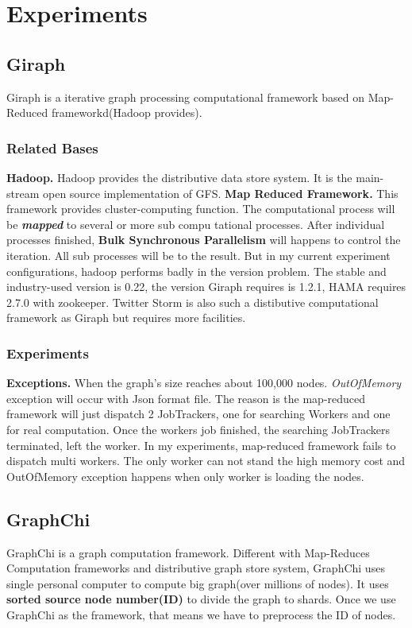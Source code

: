 \documentclass{article}
\begin{document}
	\newpage
	\section{Experiments}
	\subsection{Giraph}
	Giraph is a iterative graph processing computational framework based on Map-Reduced frameworkd(Hadoop provides).
	\subsubsection{Related Bases}
	\textbf{Hadoop.} Hadoop provides the distributive data store system. It is the main-stream open source implementation of GFS\cite{ghemawat2003the}.\newline
	\textbf{Map Reduced Framework\cite{lammel2008google's}.} This framework provides cluster-computing function. The computational process will be \textbf{\emph{mapped}} to several or more sub compu tational processes. After individual processes finished, \textbf{Bulk Synchronous Parallelism\cite{gerbessiotis1994direct}} will happens to control the iteration. All sub processes will be  to the result.\newline
	But in my current experiment configurations, hadoop performs badly in the version problem. The stable and industry-used version is 0.22, the version Giraph requires is 1.2.1, HAMA\cite{seo2010hama:} requires 2.7.0 with zookeeper. Twitter Storm\cite{storm} is also such a distibutive computational framework as Giraph but requires more facilities.
	\subsubsection{Experiments}
	\textbf{Exceptions.} When the graph's size reaches about 100,000 nodes. \emph{OutOfMemory} exception will occur with Json format file. The reason is the map-reduced framework will just dispatch 2 JobTrackers, one for searching Workers and one for real computation. Once the workers job finished, the searching JobTrackers terminated, left the worker. In my experiments, map-reduced framework fails to dispatch multi workers. The only worker can not stand the high memory cost and OutOfMemory exception happens when only worker is loading the nodes.
	\subsection{GraphChi\cite{kyrola2012graphchi:}}
	GraphChi is a graph computation framework. Different with Map-Reduces Computation frameworks and distributive graph store system, GraphChi uses single personal computer to compute big graph(over millions of nodes). It uses \textbf{sorted source node number(ID)} to divide the graph to shards. Once we use GraphChi as the framework, that means we have to preprocess the ID of nodes.
\end{document}
